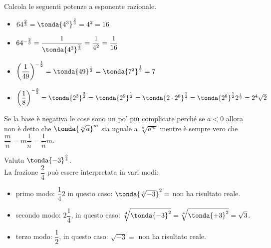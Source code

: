 \begin{esempio}{}{}
Calcola le seguenti potenze a esponente razionale.
\begin{itemize}
\item \(64^{\frac{2}{3}}=\tonda{4^3}^{\frac{2}{3}}=4^2=16\)
\item \(64^{-\frac{2}{3}}=\dfrac{1}{\tonda{4^3}^{\frac{2}{3}}}=
  \dfrac{1}{4^2}=\dfrac{1}{16}\)
\item \(\left(\dfrac 1{49}\right)^{-\frac{1}{2}}=
      \tonda{49}^{\frac{1}{2}}=\tonda{7^2}^{\frac{1}{2}}=7\)
\item \(\left(\dfrac{1}{8}\right)^{-\frac{3}{2}}=
  \tonda{2^3}^{\frac{3}{2}}=
  \tonda{2^9}^\frac{1}{2}=
  \tonda{2 \cdot 2^8}^\frac{1}{2}=
  \tonda{2^8}^{\frac{1}{2}}2^{\frac{1}{2}}=2^4 \sqrt{2}\)
\end{itemize}
\end{esempio}

Se la base è negativa le cose sono un po' più complicate perché 
se \(a < 0 \) allora non è detto che \(\tonda{\sqrt[n]{a}}^m\)
sia uguale a \(\sqrt[n]{a^m}\) mentre è sempre vero che 
\(\dfrac{m}{n} = m \dfrac{1}{n} = \dfrac{1}{n}m\).

\begin{esempio}{}{}
Valuta \(\tonda{-3}^{\frac{2}{4}}\).\\

La frazione \(\dfrac{2}{4}\) può essere interpretata in vari modi:
\begin{itemize} [left=0mm, noitemsep]
\item primo modo: \(\dfrac{1}{4} 2\) in questo caso:
\(\tonda{\sqrt[4]{-3}}^2=\) non ha risultato reale.
\item secondo modo: \(2 \dfrac{1}{4}\), in questo caso:
\(\sqrt[4]{\tonda{-3}^2}= \sqrt[4]{\tonda{+3}^2}= \sqrt{3}\).
\item terzo modo: \(\dfrac{1}{2}\), in questo caso:
\(\sqrt{-3}=\) non ha risultato reale.
\end{itemize}
\end{esempio}

